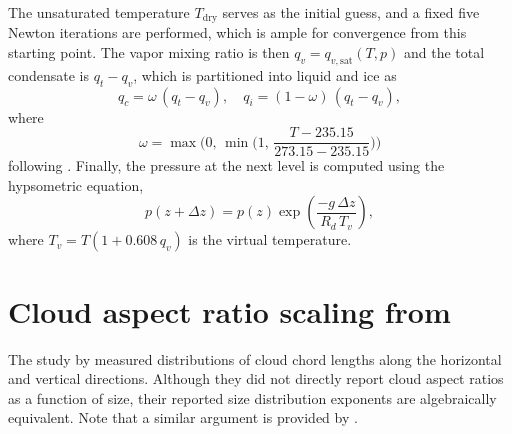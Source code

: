 \documentclass[acp, manuscript, english]{copernicus}
\begin{document}



The unsaturated temperature $T_{\mathrm{dry}}$ serves as the initial guess, and a fixed five Newton iterations are performed, which is ample for convergence from this starting point. The vapor mixing ratio is then $q_v = q_{v,\mathrm{sat}}(T, p)$ and the total condensate is $q_t - q_v$, which is partitioned into liquid and ice as
%
\begin{equation}
    q_c = \omega\,(q_t - q_v), \quad q_i = (1 - \omega)\,(q_t - q_v), \label{eq:phase_partition}
\end{equation}
%
where
%
\begin{equation}
    \omega = \max\!\Big(0,\, \min\!\Big(1,\, \frac{T - 235.15}{273.15 - 235.15}\Big)\Big) \label{eq:liquid fraction}
\end{equation}
%
following \citet{khairoutdinov2003}. Finally, the pressure at the next level is computed using the hypsometric equation,
%
\begin{equation}
    p(z + \Delta z) = p(z) \exp\!\left(\frac{-g\,\Delta z}{R_d\, T_v}\right), \label{eq:hypsometric}
\end{equation}
%
where $T_v = T(1 + 0.608\, q_v)$ is the virtual temperature.


\section{Cloud aspect ratio scaling from \citet{guillaume2018}} \label{sec:guillame}

The study by \citet{guillaume2018} measured distributions of cloud chord lengths along the horizontal and vertical directions. Although they did not directly report cloud aspect ratios as a function of size, their reported size distribution exponents are algebraically equivalent. Note that a similar argument is provided by \citet{lovejoy2021}.
\end{document}
